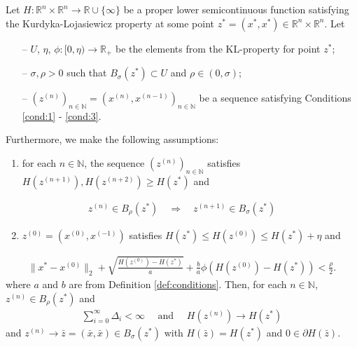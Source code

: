 \documentclass[11pt]{article}
\begin{document}
\begin{lemmamd}
	Let $H : \mathbb{R}^n \times \mathbb{R}^n \rightarrow \mathbb{R} \cup \{\infty\}$ be a proper lower semicontinuous function satisfying the Kurdyka-Lojasiewicz property at some point $z^\ast = (x^\ast, x^\ast) \in \mathbb{R}^n \times \mathbb{R}^n$. Let
	\begin{itemize}
		\item[--] $U$, $\eta$, $\phi : [0, \eta) \rightarrow \mathbb{R}_+$  be the elements from the KL-property for point $z^\ast$;
		\item[--] $\sigma, \rho > 0$ such that $B_\sigma(z^\ast) \subset U$ and $\rho \in (0, \sigma)$;
		\item[--] $(z^{(n)})_{n \in \mathbb{N}} = (x^{(n)}, x^{(n - 1)})_{n \in \mathbb{N}}$ be a sequence satisfying Conditions \ref{cond:1} - \ref{cond:3}.
	\end{itemize}
	Furthermore, we make the following assumptions:
	\begin{enumerate}[label=(A\arabic*)]
		\item for each $n \in \mathbb{N}$, the sequence $(z^{(n)})_{n \in \mathbb{N}}$ satisfies $H(z^{(n + 1)}), H(z^{(n + 2)}) \geq H(z^\ast)$ and\label{ass:1}
	\end{enumerate}
	\begin{align}
		z^{(n)} \in B_\rho(z^\ast) \quad \Rightarrow \quad z^{(n + 1)} \in B_\sigma(z^\ast)
	\end{align}
	\begin{enumerate}[label=(A\arabic*)]
		\setcounter{enumi}{1}
		\item $z^{(0)} = (x^{(0)}, x^{(-1)})$ satisfies $H(z^\ast) \leq H(z^{(0)}) \leq H(z^\ast) + \eta$ and\label{ass:2}
	\end{enumerate}
	\begin{align}
		\|x^\ast - x^{(0)}\|_2 + \sqrt{\frac{H(z^{(0)}) - H(z^\ast)}{a}} + \frac{b}{a} \phi(H(z^{(0)}) - H(z^\ast)) < \frac{\rho}{2}.
	\end{align}
	where $a$ and $b$ are from Definition \ref{def:conditions}. Then, for each $n \in \mathbb{N}$, $z^{(n)} \in B_\rho(z^\ast)$ and
	\begin{align}
		\sum_{i = 0}^\infty \Delta_i < \infty\quad\text{ and }\quad H(z^{(n)}) \rightarrow H(z^\ast)
	\end{align}
	and $z^{(n)} \rightarrow \bar{z} = (\bar{x}, \bar{x}) \in B_\sigma(z^\ast)$ with $H(\bar{z}) = H(z^\ast)$ and $0 \in \partial H(\bar{z})$.\label{lemma:lemma}
\end{lemmamd}
\end{document}
